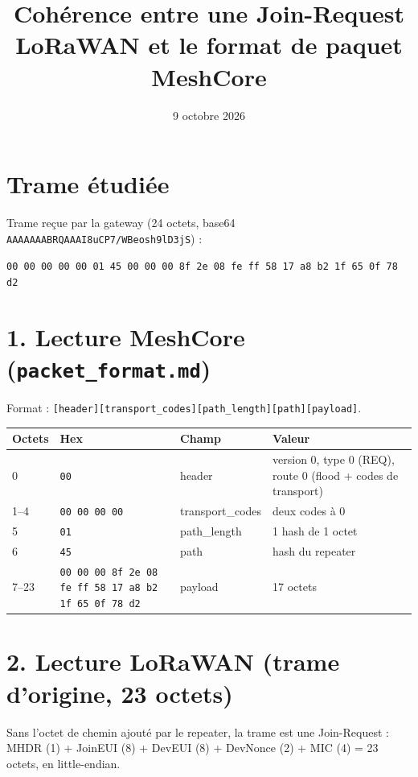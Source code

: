 \documentclass[11pt,a4paper]{article}
\title{Cohérence entre une Join-Request LoRaWAN et le format de paquet MeshCore}
\date{9 octobre 2026}
\begin{document}
\maketitle

\section*{Trame étudiée}

Trame reçue par la gateway (24 octets, base64 \texttt{AAAAAAABRQAAAI8uCP7/WBeosh9lD3jS}) :

\begin{center}
\texttt{00 00 00 00 00 01 45 00 00 00 8f 2e 08 fe ff 58 17 a8 b2 1f 65 0f 78 d2}
\end{center}

\section*{1. Lecture MeshCore (\texttt{packet\_format.md})}

Format : \texttt{[header][transport\_codes][path\_length][path][payload]}.

\begin{center}
\begin{tabular}{|l|p{5.2cm}|l|p{4cm}|}
\hline
Octets & Hex & Champ & Valeur \\ \hline
0     & \texttt{00} & header & version 0, type 0 (REQ), route 0 (flood + codes de transport) \\ \hline
1--4  & \texttt{00 00 00 00} & transport\_codes & deux codes à 0 \\ \hline
5     & \texttt{01} & path\_length & 1 hash de 1 octet \\ \hline
6     & \texttt{45} & path & hash du repeater \\ \hline
7--23 & \texttt{00 00 00 8f 2e 08 fe ff 58 17 a8 b2 1f 65 0f 78 d2} & payload & 17 octets \\ \hline
\end{tabular}
\end{center}

\section*{2. Lecture LoRaWAN (trame d'origine, 23 octets)}

Sans l'octet de chemin ajouté par le repeater, la trame est une Join-Request :
MHDR (1) + JoinEUI (8) + DevEUI (8) + DevNonce (2) + MIC (4) = 23 octets, en little-endian.
\end{document}
